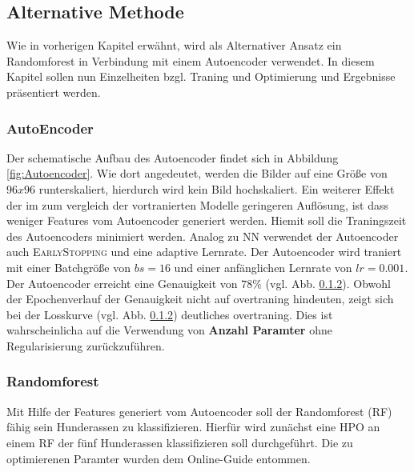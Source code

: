 \subsection{Alternative Methode}
Wie in vorherigen Kapitel erwähnt, wird als Alternativer Ansatz ein Randomforest
in Verbindung mit einem Autoencoder verwendet. In diesem Kapitel sollen nun
Einzelheiten bzgl. Traning und Optimierung und Ergebnisse präsentiert werden.

\subsubsection{AutoEncoder}
Der schematische Aufbau des Autoencoder findet sich in Abbildung \ref{fig:Autoencoder}.
Wie dort angedeutet, werden die Bilder auf eine Größe von $96x96$ runterskaliert,
hierdurch wird kein Bild hochskaliert. Ein weiterer Effekt der im zum vergleich
der vortranierten Modelle geringeren Auflösung, ist dass weniger Features
vom Autoencoder generiert werden. Hiemit soll die Traningszeit des Autoencoders
minimiert werden. Analog zu NN verwendet der Autoencoder auch \textsc{EarlyStopping}
und eine adaptive Lernrate. Der Autoencoder wird traniert mit einer Batchgröße
von $bs=16$ und einer anfänglichen Lernrate von $lr=0.001$. Der Autoencoder
erreicht eine Genauigkeit von $78\%$ (vgl. Abb. \ref{}). Obwohl der Epochenverlauf
der Genauigkeit nicht auf overtraning hindeuten, zeigt sich bei der Losskurve
(vgl. Abb. \ref{}) deutliches overtraning. Dies ist wahrscheinlicha auf die
Verwendung von \textbf{Anzahl Paramter} ohne Regularisierung zurückzuführen.

\subsubsection{Randomforest}
Mit Hilfe der Features generiert vom Autoencoder soll der
Randomforest (RF) fähig sein Hunderassen zu klassifizieren.
Hierfür wird zunächst eine HPO an einem RF der fünf Hunderassen klassifizieren soll
durchgeführt. Die zu optimierenen Paramter wurden dem Online-Guide \cite{RF_parameterraum} entommen.
